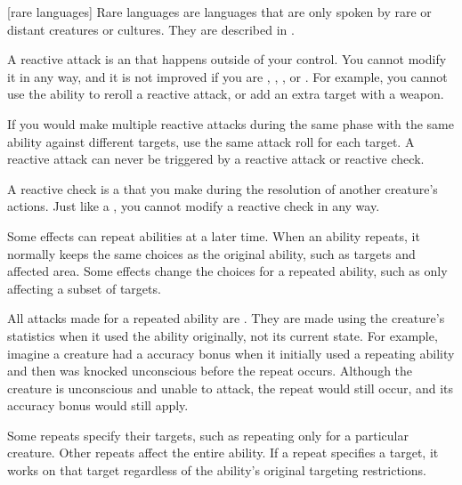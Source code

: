[rare languages] Rare languages are languages that are only spoken by rare or distant creatures or cultures.
They are described in .

 A reactive attack is an  that happens outside of your control.
You cannot modify it in any way, and it is not improved if you are \empowered, \focused, \maximized, or \primed.
For example, you cannot use the  ability to reroll a reactive attack, or add an extra target with a  weapon.

If you would make multiple reactive attacks during the same phase with the same ability against different targets, use the same attack roll for each target.
A reactive attack can never be triggered by a reactive attack or reactive check.

 A reactive check is a  that you make during the resolution of another creature's actions.
Just like a , you cannot modify a reactive check in any way.

 Some effects can repeat abilities at a later time.
When an ability repeats, it normally keeps the same choices as the original ability, such as targets and affected area.
Some effects change the choices for a repeated ability, such as only affecting a subset of targets.

All attacks made for a repeated ability are .
They are made using the creature's statistics when it used the ability originally, not its current state.
For example, imagine a creature had a  accuracy bonus when it initially used a repeating ability and then was knocked unconscious before the repeat occurs.
Although the creature is unconscious and unable to attack, the repeat would still occur, and its accuracy bonus would still apply.

Some repeats specify their targets, such as repeating only for a particular creature.
Other repeats affect the entire ability.
If a repeat specifies a target, it works on that target regardless of the ability's original targeting restrictions.

